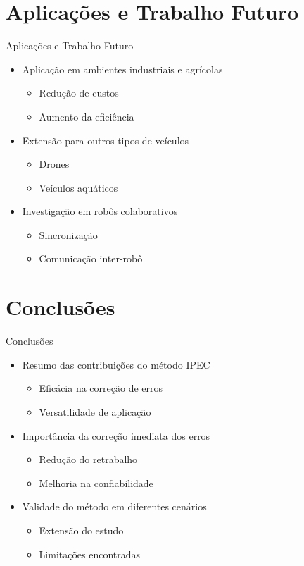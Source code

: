 \documentclass[xcolor=dvipsnames, aspectratio=169]{beamer}
\begin{document}
\section{Aplicações e Trabalho Futuro}
\begin{frame}{Aplicações e Trabalho Futuro}
  \begin{itemize}
    \item Aplicação em ambientes industriais e agrícolas
      \begin{itemize}
        \item Redução de custos
        \item Aumento da eficiência
      \end{itemize}
    \item Extensão para outros tipos de veículos
      \begin{itemize}
        \item Drones
        \item Veículos aquáticos
      \end{itemize}
    \item Investigação em robôs colaborativos
      \begin{itemize}
        \item Sincronização
        \item Comunicação inter-robô
      \end{itemize}
  \end{itemize}
\end{frame}

\section{Conclusões}
\begin{frame}{Conclusões}
  \begin{itemize}
    \item Resumo das contribuições do método IPEC
      \begin{itemize}
        \item Eficácia na correção de erros
        \item Versatilidade de aplicação
      \end{itemize}
    \item Importância da correção imediata dos erros
      \begin{itemize}
        \item Redução do retrabalho
        \item Melhoria na confiabilidade
      \end{itemize}
    \item Validade do método em diferentes cenários
      \begin{itemize}
        \item Extensão do estudo
        \item Limitações encontradas
      \end{itemize}
  \end{itemize}
\end{frame}
\end{document}
